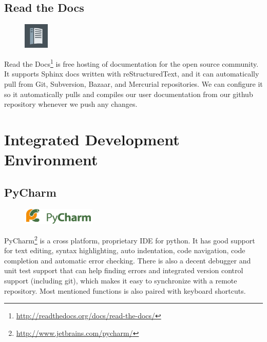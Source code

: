 \subsection{Read the Docs}
\begin{figure}
	\vspace{-20pt}
	\includegraphics[width=1.2cm]{./planning/img/readthedocs_logo}
	\vspace{-20pt}
\end{figure}
Read the Docs\footnote{\url{http://readthedocs.org/docs/read-the-docs/}} is
free hosting of documentation for the open source community. It supports Sphinx
docs written with reStructuredText, and it can automatically pull from Git,
Subversion, Bazaar, and Mercurial repositories. We can configure it so it
automatically pulls and compiles our user documentation from our github
repository whenever we push any changes.


\section{Integrated Development Environment}
\label{sec:pre:ide}

\subsection{PyCharm}
\begin{figure}
	\vspace{-20pt}
	\includegraphics[width=3.5cm]{./planning/img/pycharm_logo}
	\vspace{-20pt}
\end{figure}
PyCharm\footnote{\url{http://www.jetbrains.com/pycharm/}}
is a cross platform, proprietary IDE for python. It has good support
for text editing, syntax highlighting, auto indentation, code navigation, code
completion and automatic error checking. There is also a decent debugger and
unit test support that can help finding errors and integrated version control
support (including git), which makes it easy to synchronize with a remote
repository. Most mentioned functions is also paired with keyboard shortcuts.

